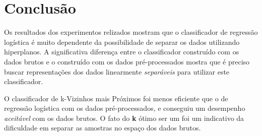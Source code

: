 \documentclass[final,5p]{elsarticle}
\numberwithin{equation}{section}
\begin{document}
\section{Conclusão}

        Os resultados dos experimentos relizados mostram que o classificador de regressão logística é muito dependente da possibilidade de separar os dados utilizando hiperplanos. A significativa diferença entre o classificador construído com os dados brutos e o construído com os dados pré-processados mostra que é preciso buscar representações dos dados linearmente \emph{separáveis} para utilizar este classificador.

        O classificador de k-Vizinhos mais Próximos foi menos eficiente que o de regressão logística com os dados pré-processados, e conseguiu um desempenho \emph{aceitável} com os dados brutos. O fato do \textbf{k} ótimo ser um foi um indicativo da dificuldade em separar as amostras no espaço dos dados brutos.














\end{document}
